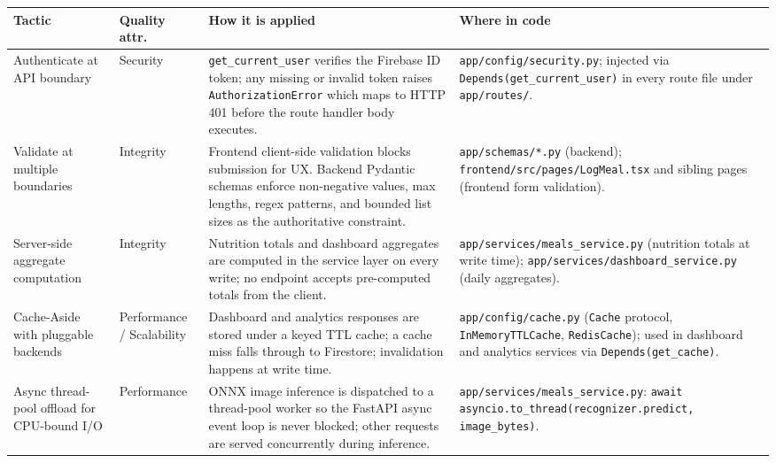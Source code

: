 \documentclass[11pt]{article}
\begin{document}
\begin{longtable}{p{3.5cm} p{2.4cm} p{4.2cm} p{4.0cm}}
  \toprule
  \textbf{Tactic} & \textbf{Quality attr.} & \textbf{How it is applied} & \textbf{Where in code} \\
  \midrule
  \endhead

  Authenticate at API boundary
    & Security
    & \texttt{get\_current\_user} verifies the Firebase ID token; any missing or invalid
      token raises \texttt{AuthorizationError} which maps to HTTP 401 before the route
      handler body executes.
    & \texttt{app/config/security.py}; injected via \texttt{Depends(get\_current\_user)}
      in every route file under \texttt{app/routes/}. \\[2pt]

  Validate at multiple boundaries
    & Integrity
    & Frontend client-side validation blocks submission for UX.
      Backend Pydantic schemas enforce non-negative values, max lengths, regex patterns,
      and bounded list sizes as the authoritative constraint.
    & \texttt{app/schemas/*.py} (backend); \texttt{frontend/src/pages/LogMeal.tsx} and
      sibling pages (frontend form validation). \\[2pt]

  Server-side aggregate computation
    & Integrity
    & Nutrition totals and dashboard aggregates are computed in the service layer on
      every write; no endpoint accepts pre-computed totals from the client.
    & \texttt{app/services/meals\_service.py} (nutrition totals at write time);
      \texttt{app/services/dashboard\_service.py} (daily aggregates). \\[2pt]

  Cache-Aside with pluggable backends
    & Performance / Scalability
    & Dashboard and analytics responses are stored under a keyed TTL cache;
      a cache miss falls through to Firestore; invalidation happens at write time.
    & \texttt{app/config/cache.py} (\texttt{Cache} protocol, \texttt{InMemoryTTLCache},
      \texttt{RedisCache}); used in dashboard and analytics services via
      \texttt{Depends(get\_cache)}. \\[2pt]

  Async thread-pool offload for CPU-bound I/O
    & Performance
    & ONNX image inference is dispatched to a thread-pool worker so the FastAPI
      async event loop is never blocked; other requests are served concurrently
      during inference.
    & \texttt{app/services/meals\_service.py}:
      \texttt{await asyncio.to\_thread(recognizer.predict, image\_bytes)}. \\[2pt]


\end{longtable}
\end{document}
